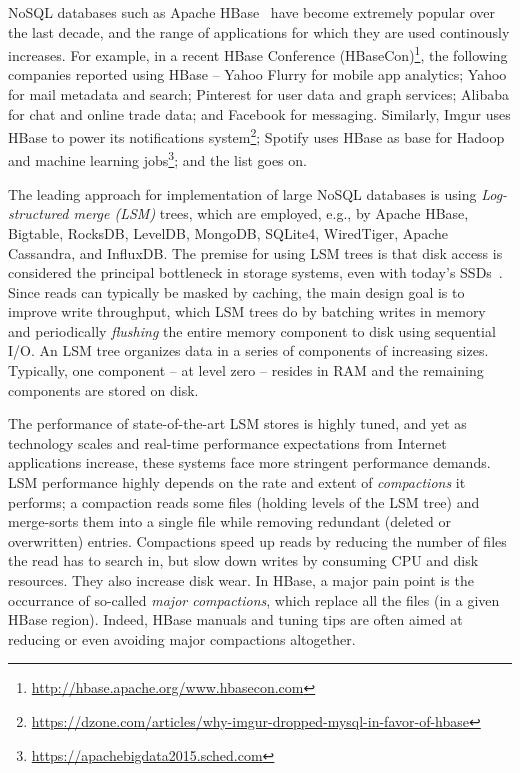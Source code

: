 
NoSQL databases such as Apache HBase~\cite{hbase} 
have become extremely popular over the last decade, and the range of applications for which they are used continously increases. 
For example, in a recent HBase Conference (HBaseCon)\footnote{\url{http://hbase.apache.org/www.hbasecon.com}}, 
the following companies reported using HBase -- 
Yahoo Flurry for mobile app analytics; Yahoo for mail metadata and search; Pinterest for user data and graph services; 
Alibaba for chat and online trade data; and Facebook for messaging. Similarly, 
Imgur uses HBase to power its notifications system\footnote{\url{https://dzone.com/articles/why-imgur-dropped-mysql-in-favor-of-hbase}};
Spotify uses HBase as base for Hadoop and machine learning
jobs\footnote{\url{https://apachebigdata2015.sched.com}};
and the list goes on. 

The leading approach for implementation of large NoSQL databases is using 
 \emph{Log-structured merge (LSM)} trees, which are employed, e.g., by  
Apache HBase, Bigtable, RocksDB, LevelDB, MongoDB, SQLite4, WiredTiger, Apache Cassandra, and InfluxDB.
The premise for using LSM trees is that disk access is considered the 
principal bottleneck in storage systems, even with today's SSDs~\cite{rocksdb,Tanenbaum:2014:MOS:2655363,Wu:2012:AWB:2093139.2093140}.
Since reads can typically be masked by caching, the main design goal is to improve write throughput, which LSM trees do by batching 
writes in memory and periodically \emph{flushing} the entire memory component to disk using sequential I/O.
An LSM tree organizes data in a series of components of increasing sizes. Typically, one component -- at level zero -- resides in RAM
and the remaining components are stored on disk. 

The performance of state-of-the-art LSM stores is highly tuned, and yet as technology scales 
and real-time performance expectations from Internet applications increase, these systems face more stringent performance demands.
LSM performance highly depends on the rate and extent of \emph{compactions} it performs; a compaction reads some files (holding
levels of the LSM tree) and merge-sorts them into a single file while removing redundant (deleted or overwritten) entries. 
Compactions speed up reads by reducing the number of files the read has to search in, but slow down writes by consuming 
CPU and disk resources. They also increase disk wear.    
In HBase, a major pain point is the occurrance of so-called \emph{major compactions}, which replace all the files (in a given HBase region).
Indeed, HBase manuals and tuning tips are often aimed at reducing or even avoiding major compactions altogether.

